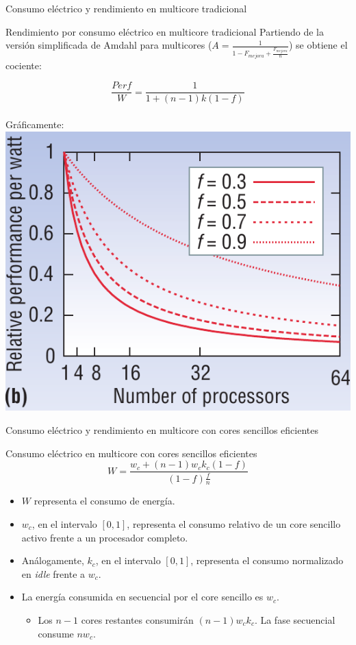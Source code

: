 \documentclass[utf8]{beamer}
\begin{document}
\begin{frame}{Consumo eléctrico y rendimiento en multicore tradicional}
    \begin{block}{Rendimiento por consumo eléctrico en multicore tradicional}
    Partiendo de la versión simplificada de Amdahl para multicores ($ A = \frac{1}{1 - F_{mejora} + \frac{F_{mejora}}{n}} $) se obtiene el cociente:
    
        $$ \frac{Perf}{W} = \frac{1}{1 + (n - 1)k(1-f)} $$
    \\
    Gráficamente:    
    \\
    \center\includegraphics[width=.3\linewidth]{figures/am_powperf_a}
    
    \end{block}    
    
\end{frame}



\begin{frame}{Consumo eléctrico y rendimiento en multicore con cores sencillos eficientes}
    \begin{block}{Consumo eléctrico en multicore con cores sencillos eficientes}
        $$ W = \frac{w_{c}+ (n - 1)w_{c}k_{c}(1-f)}{(1 - f)\frac{f}{n}} $$
        \begin{itemize}
             \item $ W $ representa el consumo de energía.
             \item $ w_{c} $, en el intervalo $ [0,1] $, representa el consumo relativo de un core sencillo activo frente a un procesador completo.
             \item Análogamente, $ k_{c} $, en el intervalo $ [0,1] $, representa el consumo normalizado en \textit{idle} frente a $ w_{c} $.
             \item La energía consumida en secuencial por el core sencillo es $ w_{c} $.
                \begin{itemize}
                    \item Los $ n -1 $ cores restantes consumirán $ (n -1)w_{c}k_{c} $. La fase secuencial consume $ n w_{c} $.
                \end{itemize}
        \end{itemize}
          
    
    \end{block}
    
    
\end{frame}
\end{document}
